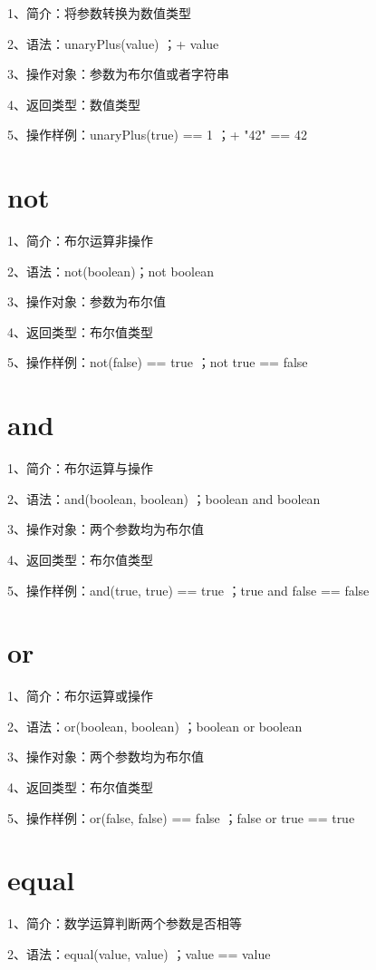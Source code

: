 1、简介：将参数转换为数值类型

2、语法：unaryPlus(value) ；+ value

3、操作对象：参数为布尔值或者字符串

4、返回类型：数值类型

5、操作样例：unaryPlus(true) == 1 ；+ "42" == 42

\section{not}

1、简介：布尔运算非操作

2、语法：not(boolean)；not boolean

3、操作对象：参数为布尔值

4、返回类型：布尔值类型

5、操作样例：not(false) == true ；not true == false

\section{and}

1、简介：布尔运算与操作

2、语法：and(boolean, boolean) ；boolean and boolean

3、操作对象：两个参数均为布尔值

4、返回类型：布尔值类型

5、操作样例：and(true, true) == true ；true and false == false

\section{or}

1、简介：布尔运算或操作

2、语法：or(boolean, boolean) ；boolean or boolean

3、操作对象：两个参数均为布尔值

4、返回类型：布尔值类型

5、操作样例：or(false, false) == false ；false or true == true

\section{equal}

1、简介：数学运算判断两个参数是否相等

2、语法：equal(value, value) ；value == value

